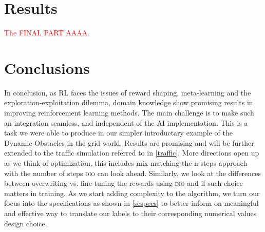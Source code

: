 \documentclass[acmsmall]{acmart}
\theoremstyle{definition}
\newcommand{\dio}{\textsc{dio}}
\begin{document}





\section{Results}
\textcolor{red}{The FINAL PART AAAA.}

 

\section{Conclusions}

In conclusion, as RL faces the issues of reward shaping, meta-learning and the exploration-exploitation dilemma, domain knowledge show promising results in 
improving reinforcement learning methods. The main challenge is to make such an integration seamless, and independent of the AI implementation. 
This is a task we were able to produce in our simpler introductary example of the Dynamic Obstacles in the grid world. Results are promising and will be further 
extended to the traffic simulation referred to in \ref{traffic}. More directions open up as we think of optimization, this includes mix-matching the n-steps approach with the 
number of steps \dio{} can look ahead. Similarly, we look at the differences between overwriting vs. fine-tuning the rewards using \dio{} and if such choice matters in training. 
As we start adding complexity to the algorithm, we turn our focus into the specifications as shown in \ref{scspecs} to better inform 
on meaningful and effective way to translate our labels to their corresponding numerical values design choice. 








\end{document}
